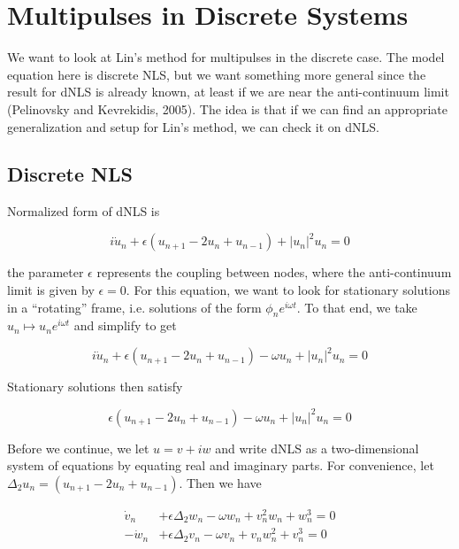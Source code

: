 \documentclass[12pt]{article}
\begin{document}
\section{Multipulses in Discrete Systems}

We want to look at Lin's method for multipulses in the discrete case. The model equation here is discrete NLS, but we want something more general since the result for dNLS is already known, at least if we are near the anti-continuum limit (Pelinovsky and Kevrekidis, 2005). The idea is that if we can find an appropriate generalization and setup for Lin's method, we can check it on dNLS.\\

\subsection{Discrete NLS}

Normalized form of dNLS is

\begin{equation}
i\dot{u}_n + \epsilon(u_{n+1} - 2 u_n + u_{n-1}) + |u_n|^2 u_n = 0
\end{equation}

the parameter $\epsilon$ represents the coupling between nodes, where the anti-continuum limit is given by $\epsilon = 0$. For this equation, we want to look for stationary solutions in a ``rotating'' frame, i.e. solutions of the form $\phi_n e^{i \omega t}$. To that end, we take $u_n \mapsto u_n e^{i \omega t}$ and simplify to get

\begin{equation}
i\dot{u}_n + \epsilon(u_{n+1} - 2 u_n + u_{n-1}) - \omega u_n + |u_n|^2 u_n = 0
\end{equation}

Stationary solutions then satisfy

\begin{equation}
\epsilon(u_{n+1} - 2 u_n + u_{n-1}) - \omega u_n + |u_n|^2 u_n = 0
\end{equation}

Before we continue, we let $u = v + i w$ and write dNLS as a two-dimensional system of equations by equating real and imaginary parts. For convenience, let $\Delta_2 u_n = (u_{n+1} - 2 u_n + u_{n-1})$. Then we have

\begin{align*}
\dot{v}_n &+ \epsilon \Delta_2 w_n - \omega w_n + v_n^2 w_n + w_n^3 = 0 \\
-\dot{w}_n &+ \epsilon \Delta_2 v_n - \omega v_n + v_n w_n^2 + v_n^3 = 0 \\
\end{align*}
\end{document}
